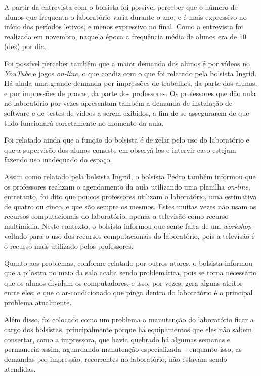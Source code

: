 A partir da entrevista com o bolsista foi possível perceber que o número de alunos que frequenta o laboratório varia durante o ano, e é mais expressivo no início dos períodos letivos, e menos expressivo no final. Como a entrevista foi realizada em novembro, naquela época a frequência média de alunos era de 10 (dez) por dia.

Foi possível perceber também que a maior demanda dos alunos é por vídeos no \textit{YouTube} e jogos \textit{on-line}, o que condiz com o que foi relatado pela bolsista Ingrid. Há ainda uma grande demanda por impressões de trabalhos, da parte dos alunos, e por impressões de provas, da parte dos professores. Os professores que dão aula no laboratório por vezes apresentam também a demanda de instalação de software e de testes de vídeos a serem exibidos, a fim de se assegurarem de que tudo funcionará corretamente no momento da aula.

Foi relatado ainda que a função do bolsista é de zelar pelo uso do laboratório e que a supervisão dos alunos consiste em observá-los e intervir caso estejam fazendo uso inadequado do espaço.

Assim como relatado pela bolsista Ingrid, o bolsista Pedro também informou que os professores realizam o agendamento da aula utilizando uma planilha \textit{on-line}, entretanto, foi dito que poucos professores utilizam o laboratório, uma estimativa de quatro ou cinco, e que são sempre os mesmos. Estes muitas vezes não usam os recursos computacionais do laboratório, apenas a televisão como recurso multimídia. Neste contexto, o bolsista informou que sente falta de um \textit{workshop} voltado para o uso dos recursos computacionais do laboratório, pois a televisão é o recurso mais utilizado pelos professores.

Quanto aos problemas, conforme relatado por outros atores, o bolsista informou que a pilastra no meio da sala acaba sendo problemática, pois se torna necessário que os alunos dividam os computadores, e isso, por vezes, gera alguns atritos entre eles; e que o ar-condicionado que pinga dentro do laboratório é o principal problema atualmente.

Além disso, foi colocado como um problema a manutenção do laboratório ficar a cargo dos bolsistas, principalmente porque há equipamentos que eles não sabem consertar, como a impressora, que havia quebrado há algumas semanas e permanecia assim, aguardando manutenção especializada -- enquanto isso, as demandas por impressão, recorrentes no laboratório, não estavam sendo atendidas.

